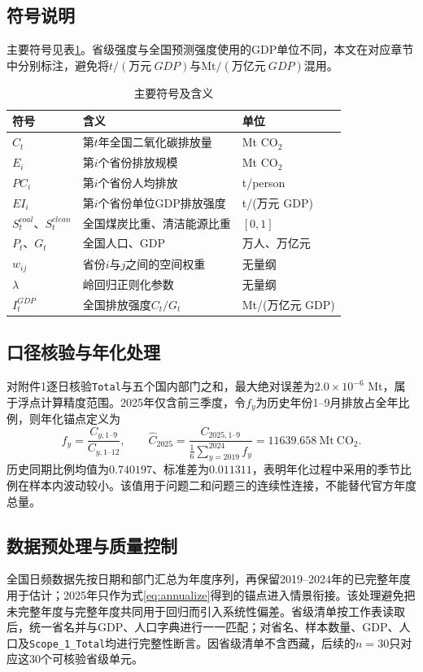 \documentclass[12pt,a4paper]{ctexart}
\theoremstyle{definition}
\theoremstyle{plain}
\theoremstyle{remark}
\begin{document}
\subsection{符号说明}
主要符号见表\ref{tab:symbol}。省级强度与全国预测强度使用的GDP单位不同，本文在对应章节中分别标注，避免将$t/(万元\ GDP)$与$\mathrm{Mt}/(万亿元\ GDP)$混用。

\begin{table}[H]
\centering
\caption{主要符号及含义}
\label{tab:symbol}
\begin{tabular}{>{\centering\arraybackslash}p{2.7cm}>{\raggedright\arraybackslash}p{7.2cm}>{\centering\arraybackslash}p{2.0cm}}
\toprule
符号 & 含义 & 单位\\
\midrule
$C_t$ & 第$t$年全国二氧化碳排放量 & Mt CO$_2$\\
$E_i$ & 第$i$个省份排放规模 & Mt CO$_2$\\
$PC_i$ & 第$i$个省份人均排放 & t/person\\
$EI_i$ & 第$i$个省份单位GDP排放强度 & t/(万元 GDP)\\
$S_t^{coal}$、$S_t^{clean}$ & 全国煤炭比重、清洁能源比重 & $[0,1]$\\
$P_t$、$G_t$ & 全国人口、GDP & 万人、万亿元\\
$w_{ij}$ & 省份$i$与$j$之间的空间权重 & 无量纲\\
$\lambda$ & 岭回归正则化参数 & 无量纲\\
$I_t^{GDP}$ & 全国排放强度$C_t/G_t$ & Mt/(万亿元 GDP)\\
\bottomrule
\end{tabular}
\end{table}

\subsection{口径核验与年化处理}
对附件1逐日核验\texttt{Total}与五个国内部门之和，最大绝对误差为$2.0\times10^{-6}$ Mt，属于浮点计算精度范围。2025年仅含前三季度，令$f_y$为历史年份1--9月排放占全年比例，则年化锚点定义为
\begin{equation}
f_y=\frac{C_{y,1\text{--}9}}{C_{y,1\text{--}12}},\qquad
\widehat C_{2025}=\frac{C_{2025,1\text{--}9}}{\frac{1}{6}\sum_{y=2019}^{2024}f_y}=11639.658\ \mathrm{Mt\ CO_2}.
\label{eq:annualize}
\end{equation}
历史同期比例均值为$0.740197$、标准差为$0.011311$，表明年化过程中采用的季节比例在样本内波动较小。该值用于问题二和问题三的连续性连接，不能替代官方年度总量。

\subsection{数据预处理与质量控制}
全国日频数据先按日期和部门汇总为年度序列，再保留2019--2024年的已完整年度用于估计；2025年只作为式\eqref{eq:annualize}得到的锚点进入情景衔接。该处理避免把未完整年度与完整年度共同用于回归而引入系统性偏差。省级清单按工作表读取后，统一省名并与GDP、人口字典进行一一匹配；对省名、样本数量、GDP、人口及\texttt{Scope\_1\_Total}均进行完整性断言。因省级清单不含西藏，后续的$n=30$只对应这30个可核验省级单元。
\end{document}
